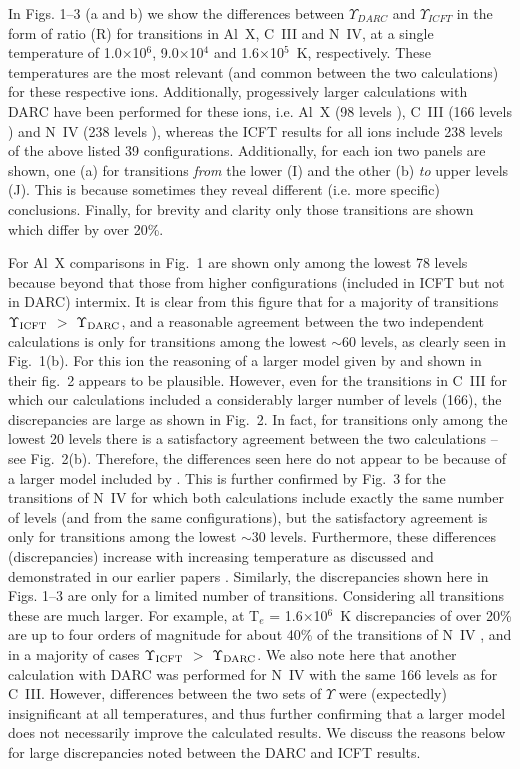 \documentclass[fleqn]{article}
\begin{document}
In Figs. 1--3 (a and b) we show the differences between $\Upsilon_{DARC}$ and $\Upsilon_{ICFT}$ in the form of ratio (R) for transitions in Al~X, C~III and N~IV, at a single  temperature of 1.0$\times$10$^6$, 9.0$\times$10$^4$ and 1.6$\times$10$^5$~K, respectively. These temperatures are the most relevant (and common between the two calculations) for these respective ions. Additionally, progessively larger calculations with DARC have been performed for these ions, i.e. Al~X (98 levels \cite{ti19}), C~III (166 levels \cite{ciii}) and N~IV (238 levels \cite{niv}), whereas the ICFT results \cite{nrbelike} for all ions include 238 levels of the above listed 39 configurations. Additionally, for each ion two panels are shown, one (a) for transitions {\em from} the lower  (I) and the other (b) {\em to} upper levels (J). This is because sometimes they reveal different (i.e. more specific) conclusions. Finally, for brevity and clarity only those transitions are shown which differ by over 20\%.

For Al~X comparisons in Fig.~1 are shown only among the lowest 78 levels because beyond that those from higher configurations (included in ICFT but not in DARC) intermix. It is clear from this figure that for a majority of transitions $\Upsilon_{\rm ICFT}$ $>$ $\Upsilon_{\rm DARC}$, and a reasonable agreement between the two independent calculations is only for transitions among the lowest $\sim$60 levels, as clearly seen in Fig.~1(b). For this ion the reasoning of a larger model given by \cite{icft2} and shown in their fig.~2 appears to be plausible. However, even for the transitions in C~III for which our calculations \cite{ciii} included a considerably larger number of levels (166), the discrepancies are large as shown in Fig.~2. In fact, for transitions only among the lowest 20 levels there is a satisfactory agreement between the two calculations -- see Fig.~2(b).   Therefore, the differences seen here do not appear to be  because of a larger model included by \cite{nrbelike}. This is further confirmed by Fig.~3 for the transitions of N~IV for which both calculations include exactly the same number of levels (and from the same configurations), but the satisfactory agreement is only for transitions among the lowest $\sim$30 levels. Furthermore, these differences (discrepancies) increase with increasing temperature as discussed and demonstrated in our earlier papers \cite{ciii, niv, alx2}. Similarly, the discrepancies shown here in Figs. 1--3 are only for a limited number of transitions. Considering all transitions these are much larger. For example, at T$_e$ = 1.6$\times$10$^{6}$~K discrepancies of over 20\% are up to four orders of magnitude for about 40\% of the transitions of N~IV \cite{niv}, and in a majority of cases $\Upsilon_{\rm ICFT}$ $>$ $\Upsilon_{\rm DARC}$. We also note here that another calculation with DARC was performed for N~IV with the same 166 levels as for C~III. However, differences between the two sets of $\Upsilon$ were (expectedly) insignificant at all temperatures, and thus further confirming that a larger model does not necessarily improve the calculated results. We discuss the reasons below for  large discrepancies noted between the DARC and ICFT results.
\end{document}
